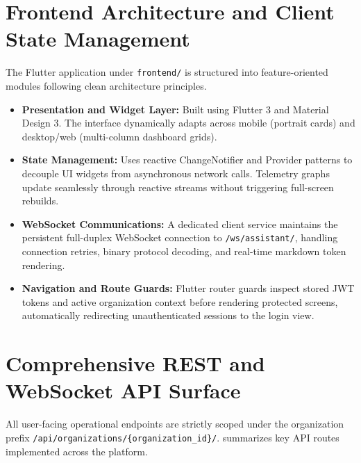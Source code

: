 \section{Frontend Architecture and Client State Management}
The Flutter application under \texttt{frontend/} is structured into feature-oriented modules following clean architecture principles.

\begin{itemize}
  \item \textbf{Presentation and Widget Layer:} Built using Flutter 3 and Material Design 3. The interface dynamically adapts across mobile (portrait cards) and desktop/web (multi-column dashboard grids).
  \item \textbf{State Management:} Uses reactive ChangeNotifier and Provider patterns to decouple UI widgets from asynchronous network calls. Telemetry graphs update seamlessly through reactive streams without triggering full-screen rebuilds.
  \item \textbf{WebSocket Communications:} A dedicated client service maintains the persistent full-duplex WebSocket connection to \texttt{/ws/assistant/}, handling connection retries, binary protocol decoding, and real-time markdown token rendering.
  \item \textbf{Navigation and Route Guards:} Flutter router guards inspect stored JWT tokens and active organization context before rendering protected screens, automatically redirecting unauthenticated sessions to the login view.
\end{itemize}

\section{Comprehensive REST and WebSocket API Surface}
All user-facing operational endpoints are strictly scoped under the organization prefix \texttt{/api/organizations/\{organization\_id\}/}.  summarizes key API routes implemented across the platform.


